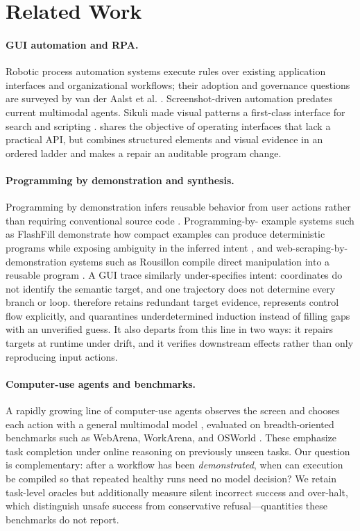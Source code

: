 \section{Related Work}

\paragraph{GUI automation and RPA.}
Robotic process automation systems execute rules over existing application
interfaces and organizational workflows; their adoption and governance
questions are surveyed by van der Aalst et al. \cite{vanderaalst2018rpa}.
Screenshot-driven automation predates current multimodal agents. Sikuli made
visual patterns a first-class interface for search and scripting
\cite{sikuli}. \system{} shares the objective of operating interfaces that lack
a practical API, but combines structured elements and visual evidence in an
ordered ladder and makes a repair an auditable program change.

\paragraph{Programming by demonstration and synthesis.}
Programming by demonstration infers reusable behavior from user actions rather
than requiring conventional source code \cite{cypher1993watch}. Programming-by-
example systems such as FlashFill demonstrate how compact examples can produce
deterministic programs while exposing ambiguity in the inferred intent
\cite{gulwani2011automating}, and web-scraping-by-demonstration systems such as
Rousillon compile direct manipulation into a reusable program
\cite{chasins2018rousillon}. A GUI trace similarly under-specifies intent:
coordinates do not identify the semantic target, and one trajectory does not
determine every branch or loop. \system{} therefore retains redundant target
evidence, represents control flow explicitly, and quarantines underdetermined
induction instead of filling gaps with an unverified guess. It also departs from
this line in two ways: it repairs targets at runtime under drift, and it verifies
downstream effects rather than only reproducing input actions.

\paragraph{Computer-use agents and benchmarks.}
A rapidly growing line of computer-use agents observes the screen and chooses
each action with a general multimodal model
\cite{anthropic2024computeruse,uitars2025,cheng2024seeclick}, evaluated on
breadth-oriented benchmarks such as WebArena, WorkArena, and OSWorld
\cite{webarena,workarena,osworld}. These emphasize task completion under online
reasoning on previously unseen tasks. Our question is complementary: after a
workflow has been \emph{demonstrated}, when can execution be compiled so that
repeated healthy runs need no model decision? We retain task-level oracles but
additionally measure silent incorrect success and over-halt, which distinguish
unsafe success from conservative refusal---quantities these benchmarks do not
report.

